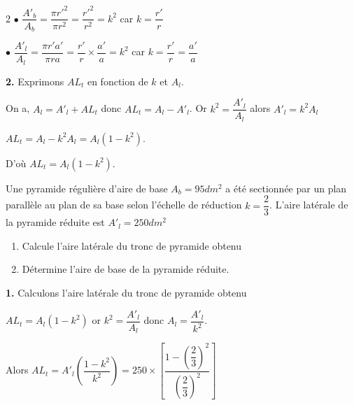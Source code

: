 \begin{multicols*}{2}
  	$\bullet$ $\dfrac{A'_{b}}{A_{b}}=\dfrac{\pi r'^2}{\pi r^2}=\dfrac{r'^2}{r^2}=k^2$ car $k=\dfrac{r'}{r}$
  	
  	$\bullet$ $\dfrac{A'_{l}}{A_{l}}=\dfrac{\pi r'a'}{\pi ra}=\dfrac{r'}{r}\times \dfrac{a'}{a}=k^2$  car $k=\dfrac{r'}{r}=\dfrac{a'}{a}$
  	
  	\textbf{2.} Exprimons $AL_{t}$  en fonction de $k$ et $A_{l}$.
  	
  	On a, $A_{l}=A'_{l}+AL_{t}$  donc $AL_{t}=A_{l}-A'_{l}$. Or $k^2=\dfrac{A'_{l}}{A_{l}}$ alors $A'_{l}=k^2 A_{l}$
  	
  	$AL_{t}=A_{l}-k^2 A_{l}= A_{l} \left(1-k^2 \right)$.
  	
  	D'où $AL_{t}=A_{l}\left(1-k^2\right)$.
  	\newpage
  	
  	Une pyramide régulière  d'aire de base $A_{b}=95dm^2$ a été sectionnée par un plan parallèle au plan de sa base selon l'échelle de réduction $k=\dfrac{2}{3}$. L'aire latérale de la pyramide réduite est $A'_{l}=250 dm^2$ 
  	\begin{enumerate}
  		\item Calcule l'aire latérale du tronc de pyramide obtenu 
  		\item Détermine l'aire de base de la pyramide réduite.  
  	\end{enumerate}
  	\dure
  	\textbf{1.}  Calculons l'aire latérale du tronc de pyramide obtenu 
  	
  	$AL_{t}=A_{l}\left(1-k^2\right)$ or $k^2= \dfrac{A'_{l}}{A_{l}}$ donc $A_{l}=\dfrac{A'_{l}}{k^2}$. 
  	
  	Alors $AL_{t}=A'_{l} \left(\dfrac{1-k^2}{k^2} \right)= 250\times \left[ \dfrac{1- \left(\dfrac{2}{3}\right)^2}{\left(\dfrac{2}{3}\right)^2} \right]$
  	

\end{multicols*}
